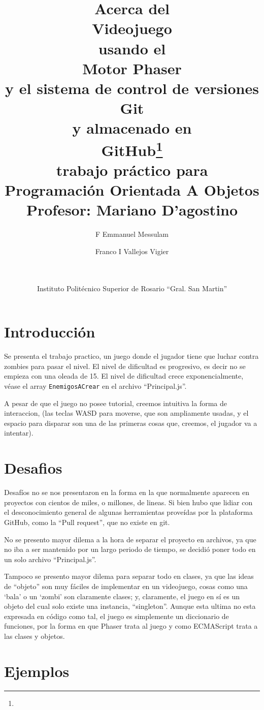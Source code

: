 \documentclass{article}
\title{\textbf{{\small Acerca del}\\
		Videojuego\\
		{\small usando el}\\
		Motor Phaser\\
		{\small y el sistema de control de versiones}\\
		Git\\
		{\small y almacenado en}\\
		GitHub\footnote{\inserturl}\\
		{\small trabajo práctico para}\\
		Programación Orientada A Objetos}\\
	Profesor: Mariano D'agostino}
\author{F Emmanuel Messulam\\
    \and Franco I Vallejos  Vigier\\
    \and \\\\
    Instituto Politécnico Superior de Rosario ``Gral. San Martin''}
\date{}
\begin{document}
    \begin{titlepage}
        \maketitle
        \thispagestyle{empty}
    \end{titlepage}
	\section*{Introducción}   
	Se presenta el trabajo practico, un juego donde el jugador tiene que luchar contra zombies para pasar el nivel. El nivel de dificultad es progresivo, es decir no se empieza con una oleada de 15. El nivel de dificultad crece exponencialmente, véase el array \verb|EnemigosACrear| en el archivo ``Principal.js''.
	
	A pesar de que el juego no posee tutorial, creemos intuitiva la forma de interaccion, (las teclas WASD para moverse, que son ampliamente usadas, y el espacio para disparar son una de las primeras cosas que, creemos, el jugador va a intentar).
	
	\section*{Desafios}
	Desafíos no se nos presentaron en la forma en la que normalmente  aparecen en proyectos con cientos de miles, o millones, de lineas. Si bien hubo que lidiar con el desconocimiento general de algunas herramientas proveídas por la plataforma GitHub, como la ``Pull request'', que no existe en git. 
	
	No se presento mayor dilema a la hora de separar el proyecto en archivos, ya que no iba a ser mantenido por un largo periodo de tiempo, se decidió poner todo en un solo archivo ``Principal.js''.
	
	Tampoco se presento mayor dilema para separar todo en clases, ya que las ideas de ``objeto'' son muy fáciles de implementar en un videojuego, cosas como una `bala' o un `zombi' son claramente clases; y, claramente, el juego en sí es un objeto del cual solo existe una instancia, ``singleton''. Aunque esta ultima no esta expresada en código como tal, el juego es simplemente un diccionario de funciones, por la forma en que Phaser trata al juego y como ECMAScript trata a las clases y objetos.

   	\section*{Ejemplos}
   	
\end{document}
